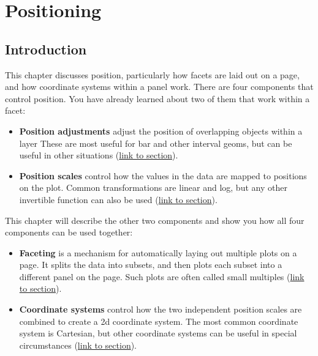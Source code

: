 \chapter{Positioning}\label{cha:position}

\section{Introduction}

This chapter discusses position, particularly how facets are laid out on
a page, and how coordinate systems within a panel work. There are four
components that control position. You have already learned about two of
them that work within a facet: 

\begin{itemize}
\itemsep1pt\parskip0pt
\item
  \textbf{Position adjustments} adjust the position of overlapping
  objects within a layer These are most useful for bar and other
  interval geoms, but can be useful in other situations
  (\hyperref[sec:position]{link to section}).
\item
  \textbf{Position scales} control how the values in the data are mapped
  to positions on the plot. Common transformations are linear and log,
  but any other invertible function can also be used
  (\hyperref[sub:scale-position]{link to section}).
\end{itemize}

This chapter will describe the other two components and show you how all
four components can be used together:

\begin{itemize}
\itemsep1pt\parskip0pt
\item
  \textbf{Faceting} is a mechanism for automatically laying out multiple
  plots on a page. It splits the data into subsets, and then plots each
  subset into a different panel on the page. Such plots are often called
  small multiples (\hyperref[sec:faceting]{link to section}).
\item
  \textbf{Coordinate systems} control how the two independent position
  scales are combined to create a 2d coordinate system. The most common
  coordinate system is Cartesian, but other coordinate systems can be
  useful in special circumstances (\hyperref[sec:coord]{link to
  section}).
\end{itemize}


